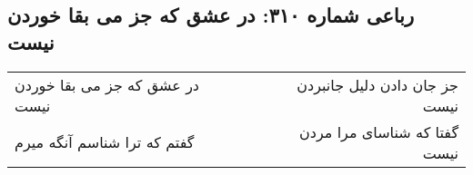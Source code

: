 \begin{center}
\section*{رباعی شماره ۳۱۰: در عشق که جز می بقا خوردن نیست}
\label{sec:0310}
\begin{longtable}{l p{0.5cm} r}
در عشق که جز می بقا خوردن نیست
&&
جز جان دادن دلیل جانبردن نیست
\\
گفتم که ترا شناسم آنگه میرم
&&
گفتا که شناسای مرا مردن نیست
\\
\end{longtable}
\end{center}
